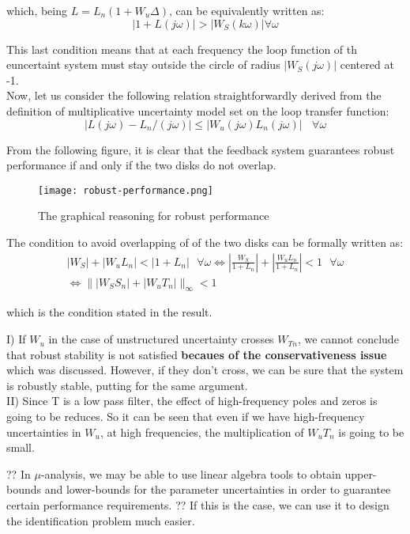 which, being $L = L_n(1+W_u\Delta)$, can be equivalently written as:
\[
|1+L(j\omega)| > |W_S(k\omega)| \forall \omega
\]

This last condition means that at each frequency the loop function of th euncertaint system must stay outside the circle of radius $|W_S(j\omega)|$ centered at -1. \\
Now, let us consider the following relation straightforwardly derived from the definition of multiplicative uncertainty model set on the loop transfer function:
\[
|L(j\omega)-L_n/(j\omega)| \leq |W_u(j\omega)L_n(j\omega)| \:\:\:\:  \forall \omega
\]


From the following figure, it is clear that the feedback system guarantees robust performance if and only if the two disks do not overlap.


\begin{figure}[H]
    \centering
    \texttt{[image: robust-performance.png]}
    \caption{The graphical reasoning for robust performance}
\end{figure}


The condition to avoid overlapping of of the two disks can be formally written as:
\[
\begin{array}{c}
|W_S|+|W_uL_n|<|1+L_n| \:\:\:\forall \omega \Leftrightarrow
|\frac{W_S}{1+L_n}|+|\frac{W_uL_n}{1+ L_n}|<1  \:\:\:\forall \omega
\\
\Leftrightarrow
\||W_SS_n|+|W_uT_n|\|_\infty <1
\end{array}
\]

which is the condition stated in the result.

\begin{QandAbox}
I) If $W_u$ in the case of unstructured uncertainty crosses $W_{Tn}$, we cannot conclude that robust stability is not satisfied \textbf{becaues of the conservativeness issue} which was discussed. However, if they don't cross, we can be sure that the system is robustly stable, putting for the same argument.\\

II) Since T is a low pass filter, the effect of high-frequency poles and zeros is going to be reduces. So it can be seen that even if we have high-frequency uncertainties  in $W_u$, at high frequencies, the multiplication of $W_uT_n$ is going to be small.
\end{QandAbox}

\begin{factbox}[Curiosity]
?? In $\mu$-analysis, we may be able to use linear algebra tools to obtain upper-bounds and lower-bounds for the parameter uncertainties in order to guarantee certain performance requirements. ?? If this is the case, we can use it to design the identification problem much easier.
\end{factbox}











